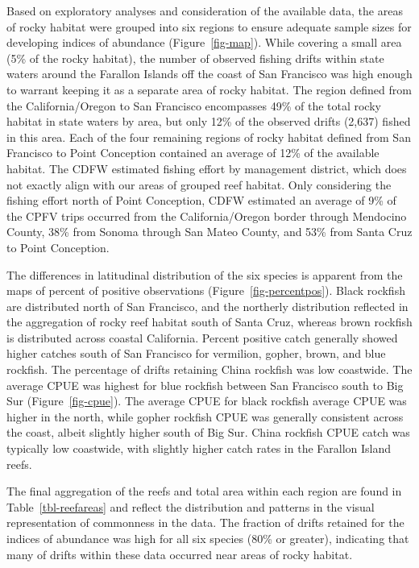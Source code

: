\documentclass[
  12pt,
  authoryear,
  preprint,
  3p]{elsarticle}
\begin{document}
Based on exploratory analyses and consideration of the available data,
the areas of rocky habitat were grouped into six regions to ensure
adequate sample sizes for developing indices of abundance
(Figure~\ref{fig-map}). While covering a small area (5\% of the rocky
habitat), the number of observed fishing drifts within state waters
around the Farallon Islands off the coast of San Francisco was high
enough to warrant keeping it as a separate area of rocky habitat. The
region defined from the California/Oregon to San Francisco encompasses
49\% of the total rocky habitat in state waters by area, but only 12\%
of the observed drifts (2,637) fished in this area. Each of the four
remaining regions of rocky habitat defined from San Francisco to Point
Conception contained an average of 12\% of the available habitat. The
CDFW estimated fishing effort by management district, which does not
exactly align with our areas of grouped reef habitat. Only considering
the fishing effort north of Point Conception, CDFW estimated an average
of 9\% of the CPFV trips occurred from the California/Oregon border
through Mendocino County, 38\% from Sonoma through San Mateo County, and
53\% from Santa Cruz to Point Conception.

The differences in latitudinal distribution of the six species is
apparent from the maps of percent of positive observations
(Figure~\ref{fig-percentpos}). Black rockfish are distributed north of
San Francisco, and the northerly distribution reflected in the
aggregation of rocky reef habitat south of Santa Cruz, whereas brown
rockfish is distributed across coastal California. Percent positive
catch generally showed higher catches south of San Francisco for
vermilion, gopher, brown, and blue rockfish. The percentage of drifts
retaining China rockfish was low coastwide. The average CPUE was highest
for blue rockfish between San Francisco south to Big Sur
(Figure~\ref{fig-cpue}). The average CPUE for black rockfish average
CPUE was higher in the north, while gopher rockfish CPUE was generally
consistent across the coast, albeit slightly higher south of Big Sur.
China rockfish CPUE catch was typically low coastwide, with slightly
higher catch rates in the Farallon Island reefs.

The final aggregation of the reefs and total area within each region are
found in Table~\ref{tbl-reefareas} and reflect the distribution and
patterns in the visual representation of commonness in the data. The
fraction of drifts retained for the indices of abundance was high for
all six species (80\% or greater), indicating that many of drifts within
these data occurred near areas of rocky habitat.
\end{document}
